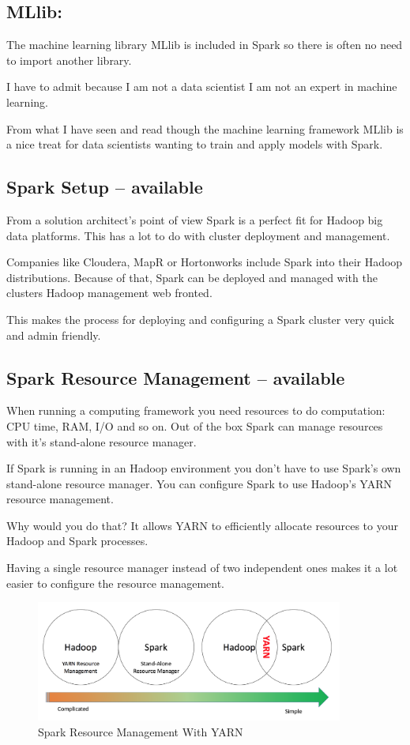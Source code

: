 \documentclass[12pt, numbers=noenddot]{scrreprt} %
\begin{document}
\subsection{MLlib:} The machine learning library MLlib is included in Spark so there is often no need to import another library.

I have to admit because I am not a data scientist I am not an expert in machine learning.

From what I have seen and read though the machine learning framework MLlib is a nice treat for data scientists wanting to train and apply models with Spark.

\subsection{Spark Setup -- available}
From a solution architect’s point of view Spark is a perfect fit for Hadoop big data platforms. This has a lot to do with cluster deployment and management.

Companies like Cloudera, MapR or Hortonworks include Spark into their Hadoop distributions. Because of that, Spark can be deployed and managed with the clusters Hadoop management web fronted.

This makes the process for deploying and configuring a Spark cluster very quick and admin friendly.

\subsection{Spark Resource Management -- available}
When running a computing framework you need resources to do computation: CPU time, RAM, I/O and so on. Out of the box Spark can manage resources with it’s stand-alone resource manager.

If Spark is running in an Hadoop environment you don’t have to use Spark’s own stand-alone resource manager. You can configure Spark to use Hadoop’s YARN resource management.

Why would you do that?
It allows YARN to efficiently allocate resources to your Hadoop and Spark processes.

Having a single resource manager instead of two independent ones makes it a lot easier to configure the resource management.

\begin{figure}[htbp]
  \centering
     \includegraphics[width=0.9\textwidth]{images/Spark-Yarn}
  \caption{Spark Resource Management With YARN}
  \label{fig:Bild1}
\end{figure}
\end{document}
